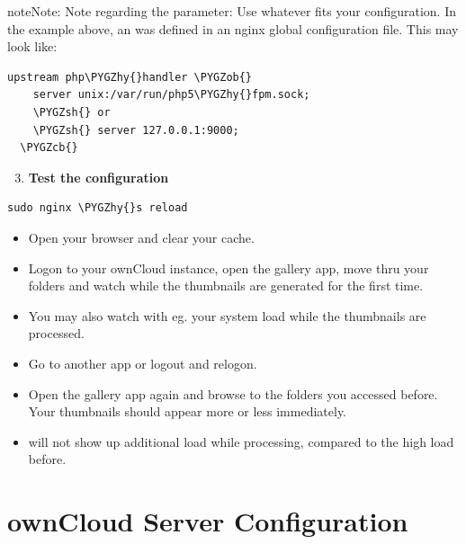 \documentclass[letterpaper,10pt,english]{sphinxmanual}
\def\PYGZob{\char`\{}
\def\PYGZcb{\char`\}}
\def\PYGZsh{\char`\#}
\def\PYGZhy{\char`\-}
\begin{document}
\begin{notice}{note}{Note:}
Note regarding the  parameter:
Use whatever fits your configuration. In the example above, an 
was defined in an nginx global configuration file.
This may look like:

\begin{Verbatim}[commandchars=\\\{\}]
upstream php\PYGZhy{}handler \PYGZob{}
    server unix:/var/run/php5\PYGZhy{}fpm.sock;
    \PYGZsh{} or
    \PYGZsh{} server 127.0.0.1:9000;
  \PYGZcb{}
\end{Verbatim}
\end{notice}
\begin{enumerate}
\setcounter{enumi}{2}
\item {} 
\textbf{Test the configuration}

\end{enumerate}

\begin{Verbatim}[commandchars=\\\{\}]
sudo nginx \PYGZhy{}s reload
\end{Verbatim}
\begin{itemize}
\item {} 
Open your browser and clear your cache.

\item {} 
Logon to your ownCloud instance, open the gallery app, move thru your
folders and watch while the thumbnails are generated for the first time.

\item {} 
You may also watch with eg.  your system load while the
thumbnails are processed.

\item {} 
Go to another app or logout and relogon.

\item {} 
Open the gallery app again and browse to the folders you accessed before.
Your thumbnails should appear more or less immediately.

\item {} 
 will not show up additional load while processing, compared to
the high load before.

\end{itemize}


\chapter{ownCloud Server Configuration}
\label{configuration_server/index:owncloud-server-configuration}\label{configuration_server/index::doc}
\end{document}
